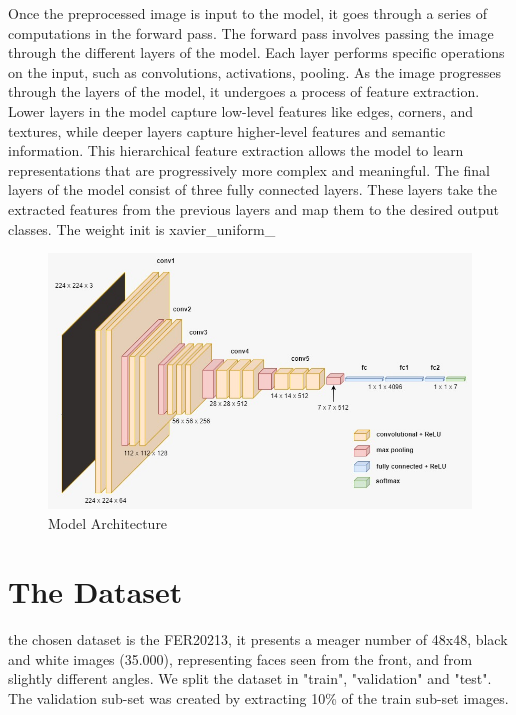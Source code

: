 \documentclass{article}
\begin{document}
Once the preprocessed image is input to the model, it goes through a series of computations in the forward pass. The forward pass involves passing the image through the different layers of the model. Each layer performs specific operations on the input, such as convolutions, activations, pooling.
As the image progresses through the layers of the model, it undergoes a process of feature extraction. Lower layers in the model capture low-level features like edges, corners, and textures, while deeper layers capture higher-level features and semantic information. This hierarchical feature extraction allows the model to learn representations that are progressively more complex and meaningful.
The final layers of the model consist of three fully connected layers. These layers take the extracted features from the previous layers and map them to the desired output classes.
The weight init is xavier\_uniform\_

\begin{figure}[htbp]

\centering
\includegraphics[width=\textwidth]{imgs/model_arch.jpeg}

\caption{Model Architecture}
\label{fig:dataset_img}

\end{figure}

\newpage
\section{The Dataset}
the chosen dataset is the FER20213, it presents a meager number of 48x48, black and white images (35.000), representing faces seen from the front, and from slightly different angles. We split the dataset in "train", "validation" and "test". The validation sub-set was created by extracting 10\% of the train sub-set images.
\end{document}

